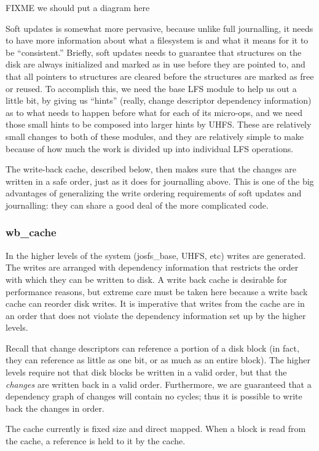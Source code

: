 FIXME we should put a diagram here

Soft updates is somewhat more pervasive, because unlike full journalling, it
needs to have more information about what a filesystem is and what it means for
it to be ``consistent.'' Briefly, soft updates needs to guarantee that
structures on the disk are always initialized and marked as in use before they
are pointed to, and that all pointers to structures are cleared before the
structures are marked as free or reused. To accomplish this, we need the base
LFS module to help us out a little bit, by giving us ``hints'' (really, change
descriptor dependency information) as to what needs to happen before what for
each of its micro-ops, and we need those small hints to be composed into larger
hints by UHFS. These are relatively small changes to both of these modules, and
they are relatively simple to make because of how much the work is divided up
into individual LFS operations.

The write-back cache, described below, then makes sure that the changes are
written in a safe order, just as it does for journalling above. This is one of
the big advantages of generalizing the write ordering requirements of soft
updates and journalling: they can share a good deal of the more complicated
code.

\subsubsection{wb\_cache}

In the higher levels of the system (josfs\_base, UHFS, etc) writes are
generated. The writes are arranged with dependency information that
restricts the order with which they can be written to disk. A
write back cache is desirable for performance reasons, but extreme
care must be taken here because a write back cache can reorder disk
writes. It is imperative that writes from the cache are in an order
that does not violate the dependency information set up by the higher
levels.

Recall that change descriptors can reference a portion of a disk block
(in fact, they can reference as little as one bit, or as much as an
entire block). The higher levels require not that disk blocks be
written in a valid order, but that the \emph{changes} are written back
in a valid order. Furthermore, we are guaranteed that a dependency
graph of changes will contain no cycles; thus it is possible to write
back the changes in order.

The cache currently is fixed size and direct mapped. When a block is
read from the cache, a reference is held to it by the cache.


